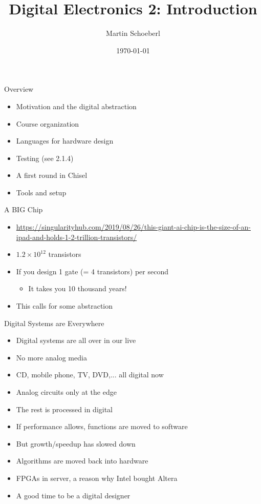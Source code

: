 \documentclass[xcolor=pdflatex,dvipsnames,table]{beamer}
\title{Digital Electronics 2: Introduction}
\author{Martin Schoeberl}
\date{\today}
\institute{Technical University of Denmark\\
Embedded Systems Engineering}
\begin{document}
\begin{frame}
\titlepage
\end{frame}


\begin{frame}[fragile]{Overview}
\begin{itemize}
\item Motivation and the digital abstraction
\item Course organization
\item Languages for hardware design
\item Testing (see 2.1.4)
\item A first round in Chisel
\item Tools and setup
\end{itemize}
\end{frame}


\begin{frame}[fragile]{A BIG Chip}
\begin{itemize}
\item \url{https://singularityhub.com/2019/08/26/this-giant-ai-chip-is-the-size-of-an-ipad-and-holds-1-2-trillion-transistors/}
\item $1.2 \times 10^{12}$ transistors
\item If you design 1 gate (= 4 transistors) per second
\begin{itemize}
\item It takes you 10 thousand years!
\end{itemize}
\item This calls for some abstraction
\end{itemize}
\end{frame}

\begin{frame}[fragile]{Digital Systems are Everywhere}
\begin{itemize}
\item Digital systems are all over in our live
\item No more analog media
\item CD, mobile phone, TV, DVD,... all digital now
\item Analog circuits only at the edge
\item The rest is processed in digital
\item If performance allows, functions are moved to software
\item But growth/speedup has slowed down
\item Algorithms are moved back into hardware
\item FPGAs in server, a reason why Intel bought Altera
\item A good time to be a digital designer
\end{itemize}
\end{frame}
\end{document}
